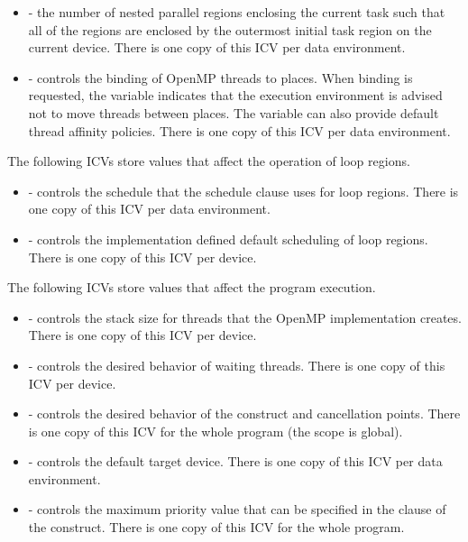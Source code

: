 \begin{itemize}
\item {} - the number of nested parallel regions enclosing the current task such that 
all of the  regions are enclosed by the outermost initial task region on the 
current device. There is one copy of this ICV per data environment. 

\item {} - controls the binding of OpenMP threads to places. When binding is 
requested, the variable indicates that the execution environment is advised not to 
move threads between places. The variable can also provide default thread affinity 
policies. There is one copy of this ICV per data environment. 
\end{itemize}

The following ICVs store values that affect the operation of loop regions.

\begin{itemize}
\item {} - controls the schedule that the  schedule clause uses for 
loop regions. There is one copy of this ICV per data environment.

\item {} - controls the implementation defined default scheduling of loop 
regions. There is one copy of this ICV per device. 
\end{itemize}

The following ICVs store values that affect the program execution.

\begin{itemize}
\item {} - controls the stack size for threads that the OpenMP implementation 
creates. There is one copy of this ICV per device. 

\item {} - controls the desired behavior of waiting threads. There is one copy 
of this ICV per device. 

\item {} - controls the desired behavior of the  construct and cancellation 
points. There is one copy of this ICV for the whole program (the scope is global).

\item {} - controls the default target device. There is one copy of this ICV 
per data environment.

\item {} - controls the maximum priority value that can be specified in the
 clause of the  construct. There is one copy of this ICV for the whole program.

\end{itemize}






